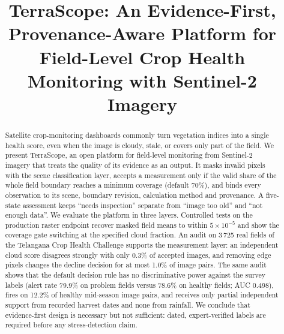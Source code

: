 \documentclass[conference]{IEEEtran}
\begin{document}
\title{TerraScope: An Evidence-First, Provenance-Aware Platform for Field-Level Crop Health Monitoring with Sentinel-2 Imagery}

\author{
\and
{}
}

\maketitle

\begin{abstract}
Satellite crop-monitoring dashboards commonly turn vegetation indices into a single health score, even when the image is cloudy, stale, or covers only part of the field. We present TerraScope, an open platform for field-level monitoring from Sentinel-2 imagery that treats the quality of its evidence as an output. It masks invalid pixels with the scene classification layer, accepts a measurement only if the valid share of the whole field boundary reaches a minimum coverage (default 70\%), and binds every observation to its scene, boundary revision, calculation method and provenance. A five-state assessment keeps ``needs inspection'' separate from ``image too old'' and ``not enough data''. We evaluate the platform in three layers. Controlled tests on the production raster endpoint recover masked field means to within $5\times10^{-5}$ and show the coverage gate switching at the specified cloud fraction. An audit on 3\,725 real fields of the Telangana Crop Health Challenge supports the measurement layer: an independent cloud score disagrees strongly with only 0.3\% of accepted images, and removing edge pixels changes the decline decision for at most 1.0\% of image pairs. The same audit shows that the default decision rule has no discriminative power against the survey labels (alert rate 79.9\% on problem fields versus 78.6\% on healthy fields; AUC 0.498), fires on 12.2\% of healthy mid-season image pairs, and receives only partial independent support from recorded harvest dates and none from rainfall. We conclude that evidence-first design is necessary but not sufficient: dated, expert-verified labels are required before any stress-detection claim.
\end{abstract}
\end{document}
